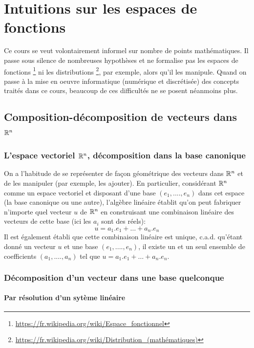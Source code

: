 
\chapter{Intuitions sur les espaces de fonctions}

Ce cours se veut volontairement informel sur nombre de points mathématiques. Il passe sous silence de nombreuses hypothèses et ne formalise pas les espaces de fonctions \footnote{\url{https://fr.wikipedia.org/wiki/Espace_fonctionnel}} ni les distributions \footnote{\url{https://fr.wikipedia.org/wiki/Distribution_(mathématiques)}}, par exemple, alors qu'il les manipule. Quand on passe à la mise en oeuvre informatique (numérique et discrétisée) des concepts traités dans ce cours, beaucoup de ces difficultés ne se posent néanmoins plus.

\section{Composition-décomposition de vecteurs dans $\mathbb{R}^n$}

\subsection{L'espace vectoriel $\mathbb{R}^n$, décomposition dans la base canonique}

On a l'habitude de se représenter de façon géométrique des vecteurs dans $\mathbb{R}^n$ et de les manipuler (par exemple, les ajouter). En particulier, considérant $\mathbb{R}^n$ comme un espace vectoriel et disposant d'une base $(e_1,....,e_n)$ dans cet espace (la base canonique ou une autre), l'algèbre linéaire établit qu'on peut fabriquer n'importe quel vecteur $u$ de $\mathbb{R}^n$ en construisant une combinaison linéaire des vecteurs de cette base (ici les $a_i$ sont des réels):
\begin{equation}
u=a_1.e_1+\dots+a_n.e_n
\label{eq:decomposition_lineaire}
\end{equation} 
Il est également établi que cette combinaison linéaire est unique, c.a.d. qu'étant donné un vecteur $u$ et une base $(e_1,....,e_n)$, il existe un et un seul ensemble de coefficients $(a_1,....,a_n)$ tel que $u=a_1.e_1+\dots+a_n.e_n$.

\subsection{Décomposition d'un vecteur dans une base quelconque}

\subsubsection{Par résolution d'un sytème linéaire}

